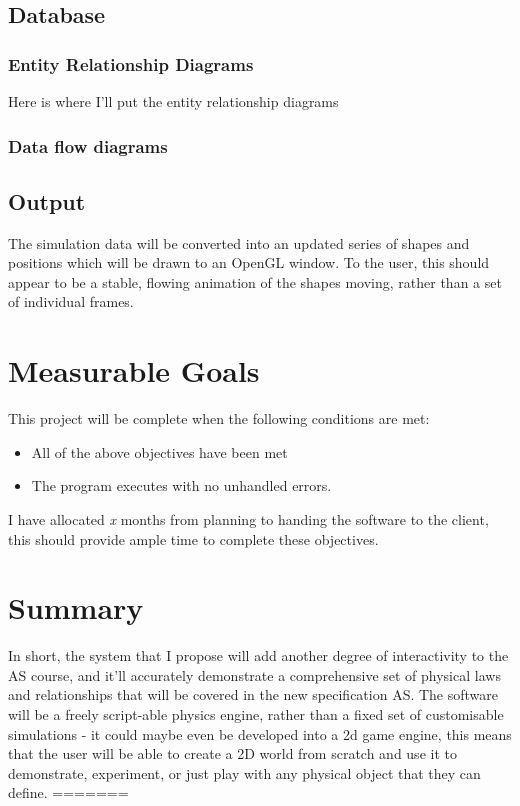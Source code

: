 \subsection{Database}

\subsubsection{Entity Relationship Diagrams}
	Here is where I'll put the entity relationship diagrams

\subsubsection{Data flow diagrams}


\subsection{Output}
	The simulation data will be  converted into an updated series of shapes and positions which will be drawn to an OpenGL window. To the user, this should appear to be a stable, flowing animation of the shapes moving, rather than a set of individual frames.
	
\section{Measurable Goals}
	This project will be complete when the following conditions are met:
	\begin{itemize}
		\item All of the above objectives have been met
		\item The program executes with no unhandled errors.
	\end{itemize}
	I have allocated \textit{x} months from planning to handing the software to the client, this should provide ample time to complete these objectives.
	




\section{Summary}
In short, the system that I propose will add another degree of interactivity to the AS course, and it'll accurately demonstrate a comprehensive set of physical laws and relationships that will be covered in the new specification AS. The software will be a freely script-able physics engine, rather than a fixed set of customisable simulations - it could maybe even be developed into a 2d game engine, this means that the user will be able to create a 2D world from scratch and use it to demonstrate, experiment, or just play with any physical object that they can define.
=======
